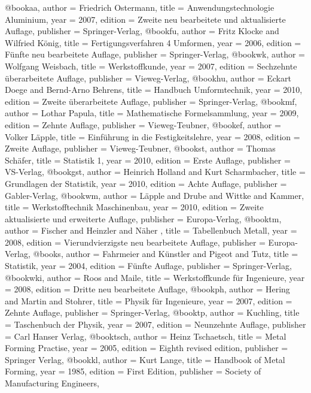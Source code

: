 @book{aa,
author = {Friedrich Ostermann},
title = {Anwendungstechnologie Aluminium},
year = {2007},
edition = {Zweite neu bearbeitete und aktualisierte Auflage},
publisher = {Springer-Verlag},
}
@book{fu,
author = {Fritz Klocke and Wilfried König},
title = {Fertigungsverfahren 4 Umformen},
year = {2006},
edition = {Fünfte neu bearbeitete Auflage},
publisher = {Springer-Verlag},
}
@book{wk,
author = {Wolfgang Weisbach},
title = {Werkstoffkunde},
year = {2007},
edition = {Sechzehnte überarbeitete Auflage},
publisher = {Vieweg-Verlag},
}
@book{hu,
author = {Eckart Doege and Bernd-Arno Behrens},
title = {Handbuch Umformtechnik},
year = {2010},
edition = {Zweite überarbeitete Auflage},
publisher = {Springer-Verlag},
}
@book{mf,
author = {Lothar Papula},
title = {Mathematische Formelsammlung},
year = {2009},
edition = {Zehnte Auflage},
publisher = {Vieweg-Teubner},
}
@book{ef,
author = {Volker Läpple},
title = {Einführung in die Festigkeitslehre},
year = {2008},
edition = {Zweite Auflage},
publisher = {Vieweg-Teubner},
}
@book{st,
author = {Thomas Schäfer},
title = {Statistik 1},
year = {2010},
edition = {Erste Auflage},
publisher = {VS-Verlag},
}
@book{gst,
author = {Heinrich Holland and Kurt Scharmbacher},
title = {Grundlagen der Statistik},
year = {2010},
edition = {Achte Auflage},
publisher = {Gabler-Verlag},
}
@book{wm,
author = {Läpple and Drube and Wittke and Kammer},
title = {Werkstofftechnik Maschinenbau},
year = {2010},
edition = {Zweite aktualisierte und erweiterte Auflage},
publisher = {Europa-Verlag},
}
@book{tm,
author = {Fischer and Heinzler and Näher },
title = {Tabellenbuch Metall},
year = {2008},
edition = {Vierundvierzigste neu bearbeitete Auflage},
publisher = {Europa-Verlag},
}
@book{s,
author = {Fahrmeier and Künstler and Pigeot and Tutz},
title = {Statistik},
year = {2004},
edition = {Fünfte Auflage},
publisher = {Springer-Verlag},
}
@book{wki,
author = {Roos and Maile},
title = {Werkstoffkunde für Ingenieure},
year = {2008},
edition = {Dritte neu bearbeitete Auflage},
}
@book{ph,
author = {Hering and Martin and Stohrer},
title = {Physik für Ingenieure},
year = {2007},
edition = {Zehnte Auflage},
publisher = {Springer-Verlag},
}
@book{tp,
author = {Kuchling},
title = {Taschenbuch der Physik},
year = {2007},
edition = {Neunzehnte Auflage},
publisher = {Carl Hanser Verlag},
}
@book{tsch,
author = {Heinz Tschaetsch},
title = {Metal Forming Practise},
year = {2005},
edition = {Eighth revised edition},
publisher = {Springer Verlag},
}
@book{kl,
author = {Kurt Lange},
title = {Handbook of Metal Forming},
year = {1985},
edition = {First Edition},
publisher = {Society of Manufacturing Engineers},
}

